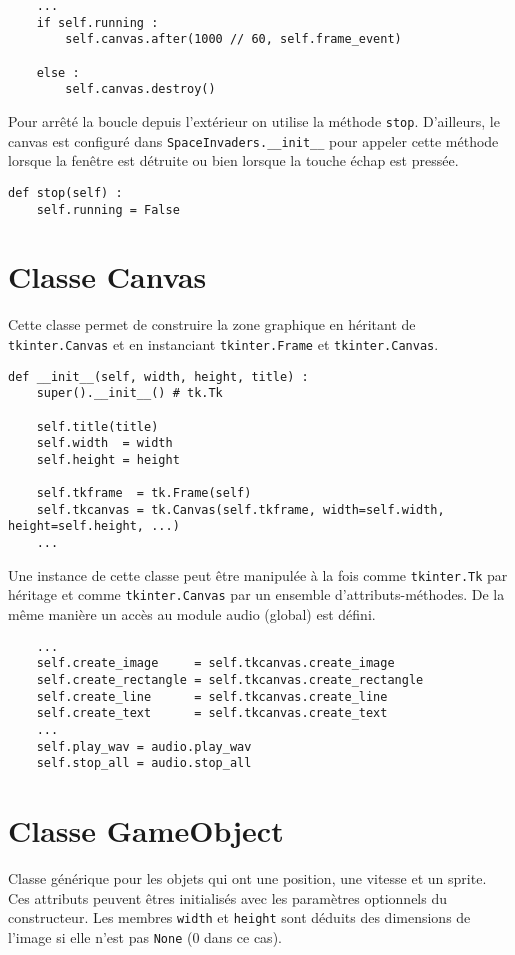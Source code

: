 \documentclass[12pt]{article}
\newcommand{\pagesection}{\newpage\section}
\begin{document}
\begin{verbatim}
	...
	if self.running :
		self.canvas.after(1000 // 60, self.frame_event)

	else :
		self.canvas.destroy()

\end{verbatim}


Pour arrêté la boucle depuis l'extérieur on utilise la méthode \texttt{stop}. D'ailleurs, le canvas est configuré dans \texttt{SpaceInvaders.\_\_init\_\_} pour appeler cette méthode lorsque la fenêtre est détruite ou bien lorsque la touche échap est pressée.

\begin{verbatim}
def stop(self) :
	self.running = False
\end{verbatim}



\pagesection{Classe Canvas}

Cette classe permet de construire la zone graphique en héritant de \texttt{tkinter.Canvas} et en instanciant \texttt{tkinter.Frame} et \texttt{tkinter.Canvas}. 

\begin{verbatim}
def __init__(self, width, height, title) :
	super().__init__() # tk.Tk
	
	self.title(title)
	self.width  = width
	self.height = height
		
	self.tkframe  = tk.Frame(self)
	self.tkcanvas = tk.Canvas(self.tkframe, width=self.width, height=self.height, ...)
	...

\end{verbatim}

Une instance de cette classe peut être manipulée à la fois comme \texttt{tkinter.Tk} par héritage et comme \texttt{tkinter.Canvas} par un ensemble d'attributs-méthodes. De la même manière un accès au module audio (global) est défini.

\begin{verbatim}
	...
	self.create_image     = self.tkcanvas.create_image
	self.create_rectangle = self.tkcanvas.create_rectangle
	self.create_line      = self.tkcanvas.create_line
	self.create_text      = self.tkcanvas.create_text
	...
	self.play_wav = audio.play_wav
	self.stop_all = audio.stop_all
\end{verbatim}



\pagesection{Classe GameObject}

Classe générique pour les objets qui ont une position, une vitesse et un
sprite. Ces attributs peuvent êtres initialisés avec les paramètres optionnels du constructeur. Les membres \texttt{width} et \texttt{height} sont déduits des dimensions de l'image si elle n'est pas \texttt{None} (0 dans ce cas).
\end{document}
